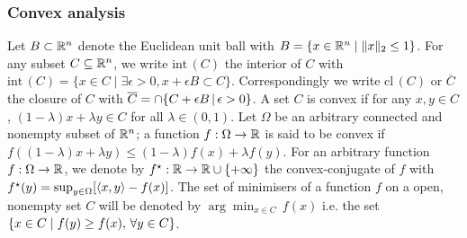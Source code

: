 \subsubsection{Convex analysis}
Let $B\subset\mathbb R^{n}$ denote the Euclidean unit ball with $B=\{x\in\mathbb R^{n}\mid \|x\|_{2}\le 1\}$. For any subset $C\subseteq\mathbb R^{n}$, we write $\mathrm{int}\,(C)$ the interior of $C$ with $\mathrm{int}\,(C)=\{x\in C \mid \exists \epsilon>0, x+\epsilon B \subset C\}$. Correspondingly we write $\mathrm{cl}\,(C)$ or $\overline C$ the closure of $C$ with $\overline C = \cap\{C+\epsilon B\,|\, \epsilon>0\}$. A set $C$ is convex if for any $x,y\in C$, $(1-\lambda)x+\lambda y\in C$ for all $\lambda\in(0,1)$. Let $\Omega$ be an arbitrary connected and nonempty subset of $\mathbb R^{n}$; a function $f:\Omega\to\mathbb R$ is said to be convex if $f((1-\lambda)x+\lambda y)\le (1-\lambda)f(x)+\lambda f(y)$. For an arbitrary function $f:\Omega\to\mathbb R$, we denote by $f^{\star}:\mathbb R\to \mathbb R\cup\{+\infty\}$ the convex-conjugate of $f$ with $f^{\star}(y)=\sup_{y\in \Omega}[\left\langle x,y \right\rangle-f(x)]$. The set of minimisers of a function $f$ on a open, nonempty set $C$ will be denoted by $\arg\min_{x\in C}\,f(x)$ i.e. the set $\left\{x\in C\mid f(y)\ge f(x), \,\forall y\in C\right\}$. 
